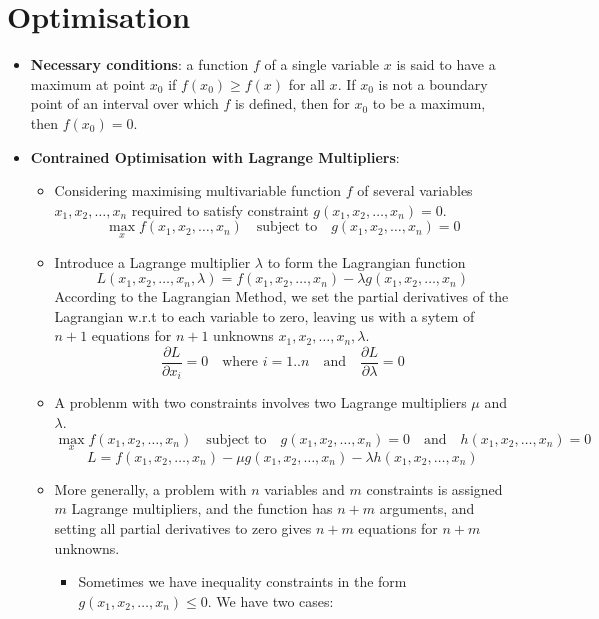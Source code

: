 \section{Optimisation}
\begin{itemize}
    \item \textbf{Necessary conditions}: a function $f$ of a single variable $x$ is said to have a maximum at point $x_0$ if $f(x_0) \geq f(x)$ for all $x$. If $x_0$ is not a boundary point of an interval over which $f$ is defined, then for $x_0$ to be a maximum, then $f(x_0)  = 0$.
    \item \textbf{Contrained Optimisation with Lagrange Multipliers}:
    \begin{itemize}[label=\textbullet]
        \item Considering maximising multivariable function $f$ of several variables $x_1, x_2, \ldots, x_n$ required to satisfy constraint $g(x_1, x_2, \ldots, x_n) = 0$.
        \[
        \max_x f(x_1, x_2, \ldots, x_n) \quad \text{subject to} \quad g(x_1, x_2, \ldots, x_n) = 0
        \]
        \item Introduce a Lagrange multiplier $\lambda$ to form the Lagrangian function
        \[
        L(x_1, x_2, \ldots, x_n, \lambda) = f(x_1, x_2, \ldots, x_n) - \lambda g(x_1, x_2, \ldots, x_n)
        \]
        According to the Lagrangian Method, we set the partial derivatives of the Lagrangian w.r.t to each variable to zero, leaving us with a sytem of $n+1$ equations for $n+1$ unknowns \( x_1, x_2, \ldots, x_n, \lambda \).
        \[\frac{\partial L}{\partial x_i} = 0 \quad \text{where }i=1..n \quad \text{and} \quad \frac{\partial L}{\partial \lambda} = 0\]
        \item A problenm with two constraints involves two Lagrange multipliers $\mu$ and $\lambda$.
        \[\max_x f(x_1, x_2, \ldots, x_n) \quad \text{subject to} \quad g(x_1, x_2, \ldots, x_n) = 0 \quad \text{and} \quad h(x_1, x_2, \ldots, x_n) = 0\]
        \[L = f(x_1, x_2, \ldots, x_n) - \mu g(x_1, x_2, \ldots, x_n) - \lambda h(x_1, x_2, \ldots, x_n)\]
        \item More generally, a problem with $n$ variables and $m$ constraints is assigned $m$ Lagrange multipliers, and the function has $n+m$ arguments, and setting all partial derivatives to zero gives $n+m$ equations for $n+m$ unknowns.
        \begin{itemize}
            \item Sometimes we have inequality constraints in the form $g(x_1, x_2, \ldots, x_n) \leq 0$. We have two cases:

\end{itemize}
\end{itemize}
\end{itemize}
